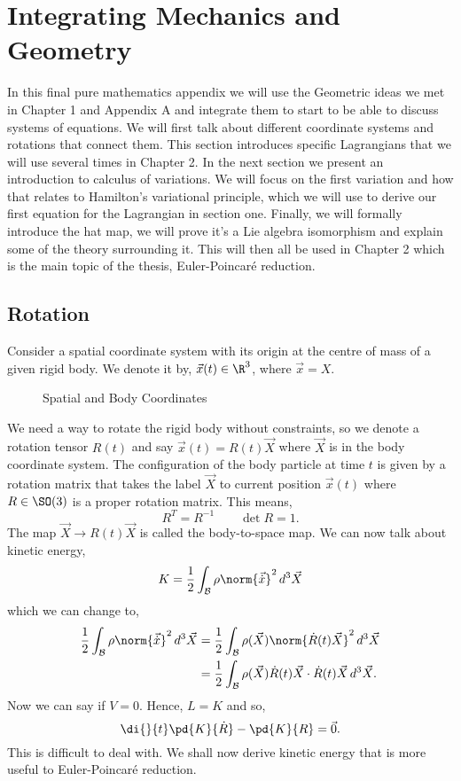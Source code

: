 
\section{Integrating Mechanics and Geometry}
In this final pure mathematics appendix we will use the Geometric ideas we met in Chapter 1 and Appendix A and integrate them to start to be able to discuss systems of equations. We will first talk about different coordinate systems and rotations that connect them. This section introduces specific Lagrangians that we will use several times in Chapter 2. In the next section we present an introduction to calculus of variations. We will focus on the first variation and how that relates to Hamilton's variational principle, which we will use to derive our first equation for the Lagrangian in section one. Finally, we will formally introduce the hat map, we will prove it's a Lie algebra isomorphism and explain some of the theory surrounding it. This will then all be used in Chapter 2 which is the main topic of the thesis, Euler-Poincar\'e reduction.

\subsection{Rotation}
Consider a spatial coordinate system with its origin at the centre of mass of a given rigid body. We denote it by, $\vec{x}(t) \in \R^3$, where $\vec x = X$.
\begin{figure}[!ht]
\centering
\resizebox{0.2\textwidth}{!}{}
\caption{Spatial and Body Coordinates}
\end{figure}
We need a way to rotate the rigid body without constraints, so we denote a rotation tensor $R(t)$ and say $\vec x(t) = R(t)\vec X$ where $\vec X$ is in the body coordinate system. The configuration of the body particle at time $t$ is given by a rotation matrix that takes the label $\vec X$ to current position $\vec x(t)$ where $R \in \SO(3)$ is a proper rotation matrix. This means,
$$ R^T = R^{-1} \qquad \det R = 1. $$
The map $\vec X \to R(t)\vec X$ is called the body-to-space map. We can now talk about kinetic energy,
$$ K = \frac{1}{2}\int_\mathcal{B} \rho \norm{\vec{\dot x}}^2\, d^3\vec X$$
which we can change to,
\begin{align*}
  \frac{1}{2}\int_\mathcal{B} \rho \norm{\vec {\dot x}}^2\, d^3\vec X &= \frac{1}{2}\int_\mathcal{B} \rho(\vec X)\norm{\dot R(t)\vec X}^2 \,d^3\vec X\\
  &= \frac{1}{2}\int_\mathcal{B} \rho(\vec X)\dot R(t)\vec X \cdot \dot R(t)\vec X \,d^3\vec X.
\end{align*}
Now we can say if $V = 0$. Hence, $L = K$ and so,
$$ \di{}{t}\pd{K}{\dot R} - \pd{K}{R} = \vec 0. $$
This is difficult to deal with. We shall now derive kinetic energy that is more useful to Euler-Poincar\'e reduction. \\

